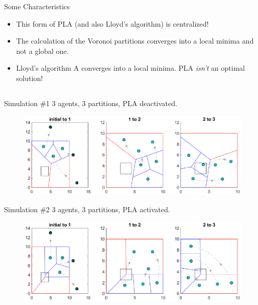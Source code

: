 \documentclass[t]{beamer}
\begin{document}
\begin{frame}[label=planotice]{Some Characteristics}
\begin{itemize}
\item This form of PLA (and also Lloyd's algorithm) is centralized!
\item The calculation of the Voronoi partitions converges into a local minima and not a global one.
\item Lloyd's algorithm A converges into a local minima. PLA \emph{isn't} an optimal solution!
\end{itemize}

\end{frame}
\subsection[Simulations]{}
\begin{frame}[label=plasim1]{Simulation \#1}
3 agents, 3 partitions, PLA deactivated.
\begin{figure}
\centering
\includegraphics[scale=0.6]{sim/sim1-3agents-3partitions-noPLA.eps}
\end{figure}
\end{frame}
\begin{frame}[label=plasim2]{Simulation \#2}
3 agents, 3 partitions, PLA activated.
\begin{figure}
\centering
\includegraphics[scale=0.6]{sim/sim2-3agents-3partitions-PLA.eps}
\end{figure}
\end{frame}
\end{document}
